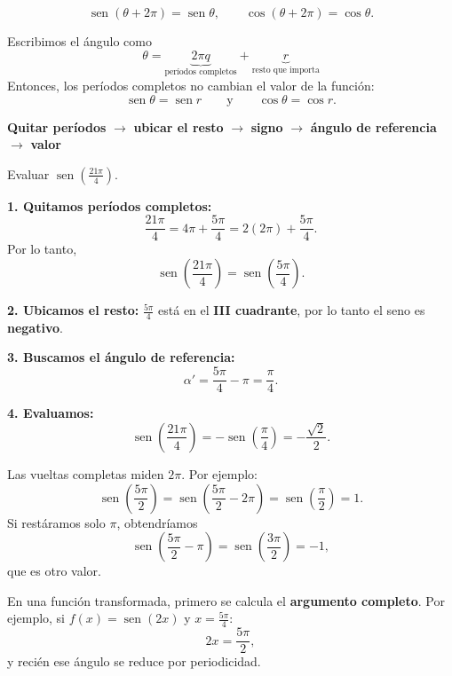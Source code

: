 \documentclass[12pt,letterpaper]{article}
\providecommand{\sen}{\operatorname{sen}}
\begin{document}
\[
\sen(\theta+2\pi)=\sen\theta,
\qquad
\cos(\theta+2\pi)=\cos\theta.
\]

\begin{estrategiabox}
Escribimos el ángulo como
\[
\boxed{
\theta=
\underbrace{2\pi q}_{\text{períodos completos}}
+
\underbrace{r}_{\text{resto que importa}}
}
\]
Entonces, los períodos completos no cambian el valor de la función:
\[
\boxed{\sen\theta=\sen r}
\qquad\text{y}\qquad
\boxed{\cos\theta=\cos r}.
\]
\end{estrategiabox}

\begin{estrategiabox}
\begin{center}
\textbf{Quitar períodos}
$\longrightarrow$
\textbf{ubicar el resto}
$\longrightarrow$
\textbf{signo}
$\longrightarrow$
\textbf{ángulo de referencia}
$\longrightarrow$
\textbf{valor}
\end{center}
\end{estrategiabox}

\newpage
\begin{ejemplobox}
Evaluar $\sen\left(\frac{21\pi}{4}\right)$.

\textbf{1. Quitamos períodos completos:}
\[
\frac{21\pi}{4}=4\pi+\frac{5\pi}{4}=2(2\pi)+\frac{5\pi}{4}.
\]
Por lo tanto,
\[
\sen\left(\frac{21\pi}{4}\right)=\sen\left(\frac{5\pi}{4}\right).
\]

\textbf{2. Ubicamos el resto:} $\frac{5\pi}{4}$ está en el \textbf{III cuadrante}, por lo tanto el seno es \textbf{negativo}.

\textbf{3. Buscamos el ángulo de referencia:}
\[
\alpha'=\frac{5\pi}{4}-\pi=\frac{\pi}{4}.
\]

\textbf{4. Evaluamos:}
\[
\sen\left(\frac{21\pi}{4}\right)
=-\sen\left(\frac{\pi}{4}\right)
=-\frac{\sqrt2}{2}.
\]
\end{ejemplobox}

\begin{alertabox}
Las vueltas completas miden $2\pi$. Por ejemplo:
\[
\sen\left(\frac{5\pi}{2}\right)
=\sen\left(\frac{5\pi}{2}-2\pi\right)
=\sen\left(\frac{\pi}{2}\right)=1.
\]
Si restáramos solo $\pi$, obtendríamos
\[
\sen\left(\frac{5\pi}{2}-\pi\right)
=\sen\left(\frac{3\pi}{2}\right)=-1,
\]
que es otro valor.

\medskip
En una función transformada, primero se calcula el \textbf{argumento completo}. Por ejemplo, si $f(x)=\sen(2x)$ y $x=\frac{5\pi}{4}$:
\[
2x=\frac{5\pi}{2},
\]
y recién ese ángulo se reduce por periodicidad.
\end{alertabox}
\end{document}
